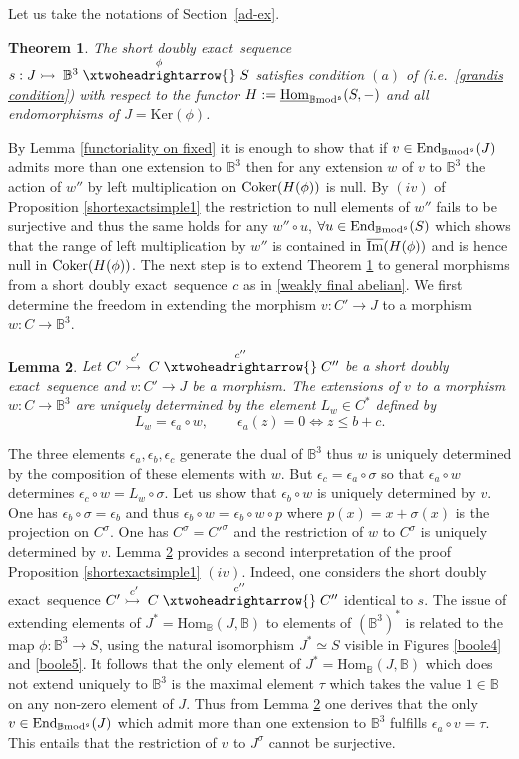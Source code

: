 \documentclass[12pt]{article}
\newtheorem{thm}{Theorem}[section]
\newtheorem{lem}[thm]{Lemma}
\def\End{{\rm End}}
\def\Hom{{\rm Hom}}
\def\Homi{{\underline{\rm Hom}}}
\def\coker{{\rm Coker}}
\def\B{{\mathbb B}}
\def\imm{\overline{\rm Im}}
\def\exxx{{doubly exact}~}
\newcommand{\ie}{{\it i.e.\/}\ }
\def\ker{{\mbox{Ker}}}
\def\Hom {{\mbox{Hom}}}
\def\End{{\mbox{End}}}
\def\b2{{\rm \B mod^{\mathfrak s}}}
\begin{document}
Let us take the notations of Section~\ref{ad-ex}. 
 \begin{thm}\label{sequence s} The short \exxx sequence $s:J\stackrel{}{\rightarrowtail{}} \B^3 \stackrel{\phi}{\xtwoheadrightarrow{}} S$ satisfies condition $(a)$ of \cite{gra1} (\ie \eqref{grandis condition}) with respect to the functor $H:=\Homi_\b2(S,-)$  and all endomorphisms of $J=\ker(\phi)$.
 \end{thm}
\proof By Lemma \ref{functoriality on fixed} it is enough to show that if $v\in\End_\b2(J)$  admits more than one extension to $\B^3$ then for any extension $w$ of $v$ to $\B^3$ the action of $w''$ by left multiplication on $\coker(H(\phi))$ is null. By $(iv)$ of Proposition \ref{shortexactsimple1} the restriction to null elements of $w''$ fails to be surjective and thus the same holds for any $w''\circ u$, $\forall u\in \End_\b2(S)$ which shows that the range of left multiplication by $w''$ is contained in $\imm(H(\phi))$ and is hence null in  $\coker(H(\phi))$. \endproof
The next step is to extend Theorem \ref{sequence s} to general morphisms from a short \exxx sequence $c$  as in \eqref{weakly final abelian}. We first determine  the freedom in extending the morphism $v:C'\to J$ to a morphism $w:C\to \B^3$. 
 \begin{lem}\label{sequence s1} Let $C'\stackrel{c'}{\rightarrowtail{}} C \stackrel{c''}{\xtwoheadrightarrow{}} C''$ be a short \exxx sequence and $v:C'\to J$ be a morphism. The extensions of $v$ to a morphism $w:C\to \B^3$ are uniquely determined by the element $L_w\in C^*$ defined by 
 $$
 L_w=\epsilon_a \circ w, \qquad \epsilon_a(z)=0 \iff z\leq  b+c.
 $$ 	
 \end{lem}
\proof The three elements $\epsilon_a, \epsilon_b, \epsilon_c$ generate the dual of $ \B^3$ thus $w$ is uniquely determined by the composition of these elements with $w$. But $\epsilon_c=\epsilon_a \circ \sigma$ so that $\epsilon_a \circ w$ determines $\epsilon_c \circ w=L_w\circ \sigma$. Let us show that $\epsilon_b \circ w$ is uniquely determined by $v$. One has $\epsilon_b \circ\sigma=\epsilon_b$ and thus
$\epsilon_b \circ w=\epsilon_b \circ w\circ p$ where $p(x)=x+\sigma(x)$ is the projection on $C^\sigma$. One has $C^\sigma=C'^\sigma$ and  the restriction of  $w$ to $C^\sigma$ is uniquely determined by $v$. \endproof 
Lemma \ref{sequence s1} provides a second interpretation of the proof Proposition \ref{shortexactsimple1} $(iv)$. Indeed, one considers the short \exxx sequence $C'\stackrel{c'}{\rightarrowtail{}} C \stackrel{c''}{\xtwoheadrightarrow{}} C''$ identical to $s$. The issue of extending elements of $J^*=\Hom_\B(J,\B)$ to elements of $(\B^3)^*$ is related to the map $\phi:\B^3\to S$, using the natural isomorphism $J^*\simeq S$ visible in Figures \ref{boole4} and \ref{boole5}. It follows that the only element of $J^*=\Hom_\B(J,\B)$ which does not extend uniquely to $\B^3$ is the maximal element $\tau$ which takes the value $1\in \B$ on any non-zero element of $J$.  Thus  from Lemma \ref{sequence s1} one derives that the only  $v\in\End_\b2(J)$ which admit more than one extension to $\B^3$ fulfills  $\epsilon_a \circ v=\tau$. This entails that the restriction of $v$ to $J^\sigma$ cannot be surjective.
\end{document}
